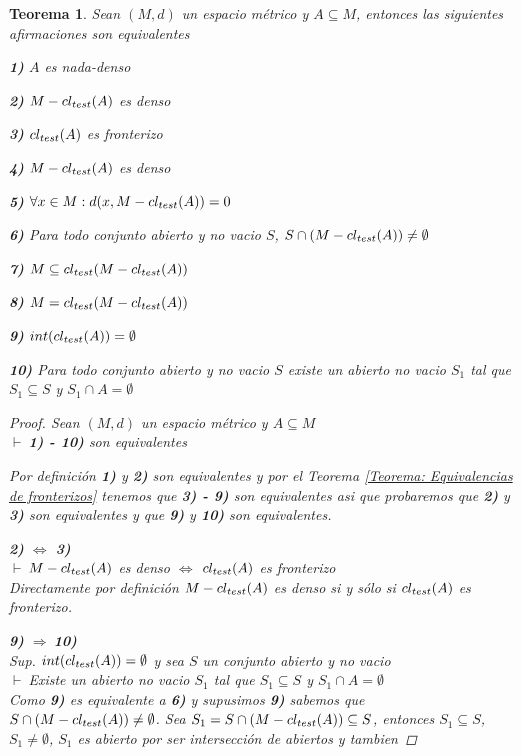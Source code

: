 \documentclass[oneside]{book} %
\theoremstyle{Teorema}
\newtheorem{Teorema}[Definicion]{Teorema}
\theoremstyle{Ejemplos}
\theoremstyle{[Obs]}
\def \test {test}
\newcommand{\cerradura}[2][\test]{\ifx \test #1 {\overline{#2}} \else {cl_{#1}(#2)} \fi} %
\renewcommand{\{}{\left\lbrace} %
\renewcommand{\}}{\right\rbrace} %
\newcommand{\n}{\cap} %
\renewcommand{\sc}{\subseteq} %
\newcommand{\pd}{$\vdash\ $} %
\newcommand{\Imp}{$\Rightarrow\ $} %
\begin{document}
			\begin{Teorema}\setlength{\parindent}{0em}
			
				Sean $(M, d)$ un espacio métrico y $A \sc M$, entonces las siguientes afirmaciones son equivalentes 

				\textbf{1)} $A$ es nada-denso

				\textbf{2)} $M - \cerradura{A}$ es denso

				\textbf{3)} $\cerradura{A}$ es fronterizo

				\textbf{4)} $M - \cerradura{A}$ es denso

				\textbf{5)} $\forall x \in M : d(x, M - \cerradura{A}) = 0$

				\textbf{6)} Para todo conjunto abierto y no vacio $S$, $S \n (M - \cerradura{A}) \neq \emptyset$

				\textbf{7)} $M \sc \cerradura{M - \cerradura{A}}$

				\textbf{8)} $M = \cerradura{M - \cerradura{A}}$

				\textbf{9)} $int(\cerradura{A}) = \emptyset$

				\textbf{10)} Para todo conjunto abierto y no vacio $S$ existe un abierto no vacio $S_1$ tal que $S_1 \sc S$ y $S_1 \n A = \emptyset$

				\begin{proof}
					
					Sean $(M, d)$ un espacio métrico y $A \sc M$ \\ 
					\pd \textbf{1) - 10)} son equivalentes 

					Por definición \textbf{1)} y \textbf{2)} son equivalentes y por el Teorema \ref{Teorema: Equivalencias de fronterizos} tenemos que \textbf{3) - 9)} son equivalentes asi que probaremos que \textbf{2)} y \textbf{3)} son equivalentes y que \textbf{9)} y \textbf{10)} son equivalentes.

					\textbf{2)} $\Leftrightarrow$ \textbf{3)} \\
					\pd $M - \cerradura{A}$ es denso $\Leftrightarrow$ $\cerradura{A}$ es fronterizo \\ 
					Directamente por definición $M - \cerradura{A}$ es denso si y sólo si $\cerradura{A}$ es fronterizo.

					\textbf{9)} \Imp \textbf{10)} \\ 
					Sup. $int(\cerradura{A}) = \emptyset$ y sea $S$ un conjunto abierto y no vacio \\ 
					\pd Existe un abierto no vacio $S_1$ tal que $S_1 \sc S$ y $S_1 \n A = \emptyset$ \\ 
					Como \textbf{9)} es equivalente a \textbf{6)} y supusimos \textbf{9)} sabemos que $S \n (M - \cerradura{A}) \neq \emptyset$. Sea $S_1 = S \n (M - \cerradura{A}) \sc S$, entonces $S_1 \sc S$, $S_1 \neq \emptyset$, $S_1$ es abierto por ser intersección de abiertos y tambien 
					

\end{proof}
\end{Teorema}
\end{document}
